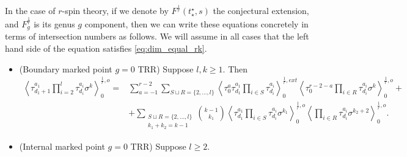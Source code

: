 \documentclass[11pt]{amsart}
\theoremstyle{definition}
\theoremstyle{remark}
\newcommand{\<}{\left<}
\renewcommand{\>}{\right>}
\numberwithin{equation}{section}
\begin{document}
In the case of $r$-spin theory, if we denote by $F^{\frac{1}{r}}(t_\star^\star,s)$ the conjectural extension, and $F^{\frac{1}{r}}_g$ is its genus $g$ component, then we can write these equations concretely in terms of intersection numbers as follows. We will assume in all cases that the left hand side of the equation satisfies \eqref{eq:dim_equal_rk}.
\begin{itemize}
\item[(a)] (Boundary marked point %
$g=0$ TRR) Suppose %
$l,k\geq 1$.  %
Then
\begin{align*}
\< \tau_{d_1+1}^{a_1}\prod_{i=2}^l\tau^{a_i}_{d_i}\sigma^k\>^{\frac{1}{r},o}_0=&
\sum_{a=-1}^{r-2}\sum_{S \sqcup R = \{2,\ldots,l\}}\left\langle \tau_0^{a}\tau_{d_1}^{a_1}\prod_{i \in S}\tau_{d_i}^{a_i}\right\rangle^{\frac{1}{r},{ext}}_0
\left\langle \tau_0^{r-2-a}\prod_{i\in R}\tau^{a_i}_{d_i}\sigma^k\right\rangle^{\frac{1}{r},o}_0+\\
&+\sum_{\substack{S \sqcup R = \{2,\ldots,l\} \\ k_1 + k_2 = k-1}} \binom{k-1}{k_1} \left\langle \tau^{a_1}_{d_1}\prod_{i \in S} \tau^{a_i}_{d_i}\sigma^{k_1}\right\rangle^{\frac{1}{r},o}_0 \left\langle \prod_{i \in R} \tau^{a_i}_{d_i} \sigma^{k_2+2}\right\rangle^{\frac{1}{r}, o}_0.
\end{align*}
\item[(b)] (Internal %
marked point %
$g=0$ TRR) Suppose %
$l\geq 2$.  %

\end{itemize}
\end{document}
